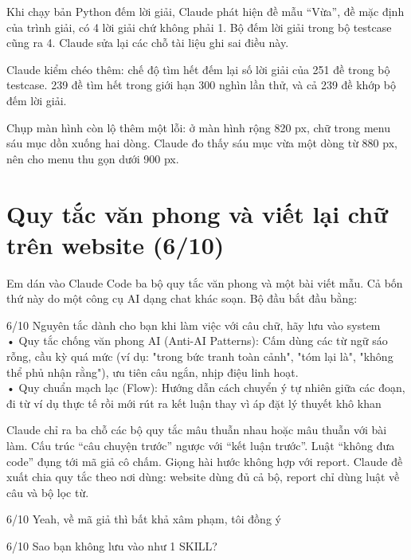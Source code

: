 Khi chạy bản Python đếm lời giải, Claude phát hiện đề mẫu ``Vừa'', đề mặc định của trình giải, có 4 lời giải chứ không phải 1. Bộ đếm lời giải trong bộ testcase cũng ra 4. Claude sửa lại các chỗ tài liệu ghi sai điều này.

Claude kiểm chéo thêm: chế độ tìm hết đếm lại số lời giải của 251 đề trong bộ testcase. 239 đề tìm hết trong giới hạn 300 nghìn lần thử, và cả 239 đề khớp bộ đếm lời giải.

Chụp màn hình còn lộ thêm một lỗi: ở màn hình rộng 820 px, chữ trong menu sáu mục dồn xuống hai dòng. Claude đo thấy sáu mục vừa một dòng từ 880 px, nên cho menu thu gọn dưới 900 px.

\section{Quy tắc văn phong và viết lại chữ trên website (6/10)}
\label{sec:writing-rules}

Em dán vào Claude Code ba bộ quy tắc văn phong và một bài viết mẫu. Cả bốn thứ này do một công cụ AI dạng chat khác soạn. Bộ đầu bắt đầu bằng:

\begin{promptbox}{6/10}
Nguyên tắc dành cho bạn khi làm việc với câu chữ, hãy lưu vào system\\
• Quy tắc chống văn phong AI (Anti-AI Patterns): Cấm dùng các từ ngữ sáo rỗng, cầu kỳ quá mức (ví dụ: "trong bức tranh toàn cảnh", "tóm lại là", "không thể phủ nhận rằng"), ưu tiên câu ngắn, nhịp điệu linh hoạt.\\
• Quy chuẩn mạch lạc (Flow): Hướng dẫn cách chuyển ý tự nhiên giữa các đoạn, đi từ ví dụ thực tế rồi mới rút ra kết luận thay vì áp đặt lý thuyết khô khan
\end{promptbox}

Claude chỉ ra ba chỗ các bộ quy tắc mâu thuẫn nhau hoặc mâu thuẫn với bài làm. Cấu trúc ``câu chuyện trước'' ngược với ``kết luận trước''. Luật ``không đưa code'' đụng tới mã giả cô chấm. Giọng hài hước không hợp với report. Claude đề xuất chia quy tắc theo nơi dùng: website dùng đủ cả bộ, report chỉ dùng luật về câu và bộ lọc từ.

\begin{promptbox}{6/10}
Yeah, về mã giả thì bất khả xâm phạm, tôi đồng ý
\end{promptbox}

\begin{promptbox}{6/10}
Sao bạn không lưu vào như 1 SKILL?
\end{promptbox}

